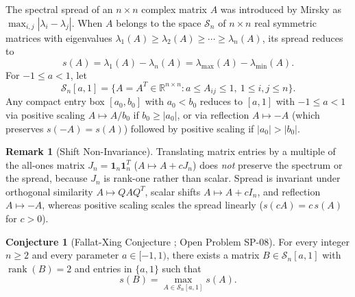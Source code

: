 \documentclass[11pt,reqno]{article}
\theoremstyle{definition}
\newtheorem{conjecture}[theorem]{Conjecture}
\newtheorem{remark}[theorem]{Remark}
\newcommand{\R}{\mathbb{R}}
\newcommand{\one}{\mathbf{1}}
\newcommand{\rank}{\operatorname{rank}}
\begin{document}
The spectral spread of an $n \times n$ complex matrix $A$ was introduced by Mirsky \cite{mirsky1956spread} as $\max_{i,j}|\lambda_i - \lambda_j|$. When $A$ belongs to the space $\mathcal{S}_n$ of $n \times n$ real symmetric matrices with eigenvalues $\lambda_1(A) \ge \lambda_2(A) \ge \cdots \ge \lambda_n(A)$, its spread reduces to
\begin{equation}
s(A) = \lambda_1(A) - \lambda_n(A) = \lambda_{\max}(A) - \lambda_{\min}(A).
\end{equation}
For $-1 \le a < 1$, let
\begin{equation}
\mathcal{S}_n[a, 1] = \{ A = A^T \in \R^{n \times n} : a \le A_{ij} \le 1,\ 1 \le i, j \le n \}.
\end{equation}
Any compact entry box $[a_0, b_0]$ with $a_0 < b_0$ reduces to $[a, 1]$ with $-1 \le a < 1$ via positive scaling $A \mapsto A/b_0$ if $b_0 \ge |a_0|$, or via reflection $A \mapsto -A$ (which preserves $s(-A) = s(A)$) followed by positive scaling if $|a_0| > |b_0|$.

\begin{remark}[Shift Non-Invariance]
Translating matrix entries by a multiple of the all-ones matrix $J_n = \one_n \one_n^T$ ($A \mapsto A + c J_n$) does \emph{not} preserve the spectrum or the spread, because $J_n$ is rank-one rather than scalar. Spread is invariant under orthogonal similarity $A \mapsto Q A Q^T$, scalar shifts $A \mapsto A + c I_n$, and reflection $A \mapsto -A$, whereas positive scaling scales the spread linearly ($s(c A) = c\, s(A)$ for $c > 0$).
\end{remark}

\begin{conjecture}[Fallat-Xing Conjecture \cite{fallat2012spread}; Open Problem SP-08]\label{conj:fx}
For every integer $n \ge 2$ and every parameter $a \in [-1, 1)$, there exists a matrix $B \in \mathcal{S}_n[a, 1]$ with $\rank(B) = 2$ and entries in $\{a, 1\}$ such that
\[
s(B) = \max_{A \in \mathcal{S}_n[a, 1]} s(A).
\]
\end{conjecture}
\end{document}
